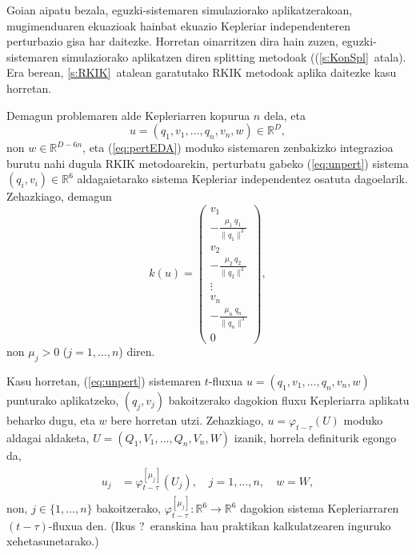 Goian aipatu bezala, eguzki-sistemaren simulaziorako aplikatzerakoan,  mugimenduaren ekuazioak hainbat ekuazio Kepleriar independenteren
perturbazio gisa har daitezke.  Horretan oinarritzen dira hain zuzen, eguzki-sistemaren simulaziorako aplikatzen diren splitting metodoak ((\ref{s:KonSpl}~atala).
Era berean, \ref{s:RKIK}~atalean garatutako RKIK metodoak aplika daitezke kasu horretan.

Demagun problemaren alde Kepleriarren kopurua $n$ dela, eta
\begin{equation*}
u=(q_1,v_1,\ldots,q_n,v_n,w) \in \mathbb{R}^{D},
\end{equation*}
 non $w \in \mathbb{R}^{D-6 n}$, eta (\ref{eq:pertEDA}) moduko sistemaren zenbakizko integrazioa burutu nahi dugula RKIK metodoarekin, perturbatu gabeko (\ref{eq:unpert}) sistema $(q_i,v_i) \in \mathbb{R}^{6}$ aldagaietarako sistema Kepleriar independentez osatuta dagoelarik. Zehazkiago, demagun
%
\begin{equation}
\label{eq: n-pertEDA}
k(u) =
\left(\begin{array}{c}
               v_1 \\
             \displaystyle  - \frac{\mu_1 \ q_1}{\|q_1\|^3}\\
               v_2 \\
                \displaystyle  - \frac{\mu_2 \ q_2}{\|q_2\|^3}\\
                \vdots \\
                v_n\\
                \displaystyle  - \frac{\mu_n \ q_n}{\|q_n\|^3}\\
                               0
\end{array}\right),
\end{equation}
%
non $\mu_j>0$ ($j=1,\ldots,n$) diren.

Kasu horretan, (\ref{eq:unpert}) sistemaren $t$-fluxua $u=(q_1,v_1,\ldots,q_n,v_n,w)$ punturako aplikatzeko, $(q_j,v_j)$ bakoitzerako dagokion fluxu Kepleriarra
aplikatu beharko dugu, eta $w$ bere horretan utzi. Zehazkiago,
 $u = \varphi_{t-\tau}(U)$ moduko aldagai aldaketa, $U=(Q_1,V_1,\ldots,Q_n,V_n,W)$ izanik, horrela definiturik egongo da,
%
\begin{align}
\label{eq:aldfl2}
\begin{split}
u_j&= \varphi_{t-\tau}^{[\mu_j]}(U_j), \quad  j=1,\dots,n, \quad w = W,
\end{split}
\end{align}
%
non, $j \in \{1,\ldots,n\}$ bakoitzerako, $\varphi_{t-\tau}^{[\mu_j]}:\mathbb{R}^6 \to \mathbb{R}^6$ dagokion sistema Kepleriarraren $(t-\tau)$-fluxua den. (Ikus ?~eranskina hau praktikan kalkulatzearen inguruko xehetasunetarako.)


